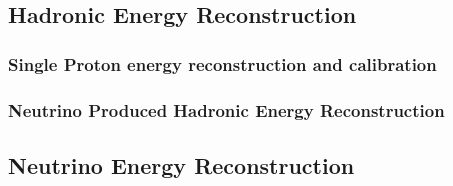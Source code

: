 \subsection{Hadronic Energy Reconstruction}
\subsubsection{Single Proton energy reconstruction and calibration}

\subsubsection{Neutrino Produced Hadronic Energy Reconstruction}

\subsection{Neutrino Energy Reconstruction}